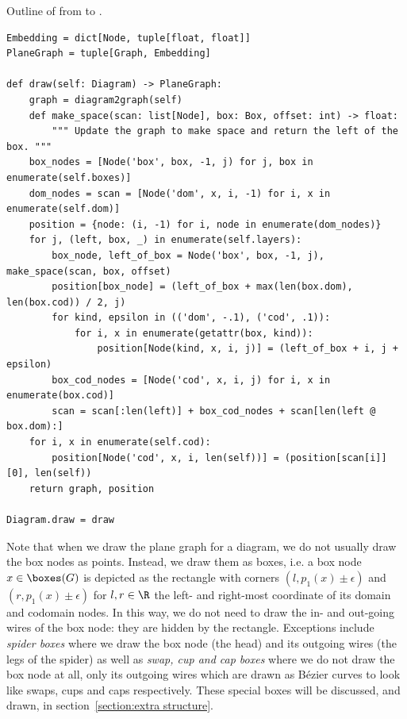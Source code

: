 \begin{python}
{\normalfont Outline of  from  to .}

\begin{verbatim}
Embedding = dict[Node, tuple[float, float]]
PlaneGraph = tuple[Graph, Embedding]

def draw(self: Diagram) -> PlaneGraph:
    graph = diagram2graph(self)
    def make_space(scan: list[Node], box: Box, offset: int) -> float:
        """ Update the graph to make space and return the left of the box. """
    box_nodes = [Node('box', box, -1, j) for j, box in enumerate(self.boxes)]
    dom_nodes = scan = [Node('dom', x, i, -1) for i, x in enumerate(self.dom)]
    position = {node: (i, -1) for i, node in enumerate(dom_nodes)}
    for j, (left, box, _) in enumerate(self.layers):
        box_node, left_of_box = Node('box', box, -1, j), make_space(scan, box, offset)
        position[box_node] = (left_of_box + max(len(box.dom), len(box.cod)) / 2, j)
        for kind, epsilon in (('dom', -.1), ('cod', .1)):
            for i, x in enumerate(getattr(box, kind)):
                position[Node(kind, x, i, j)] = (left_of_box + i, j + epsilon)
        box_cod_nodes = [Node('cod', x, i, j) for i, x in enumerate(box.cod)]
        scan = scan[:len(left)] + box_cod_nodes + scan[len(left @ box.dom):]
    for i, x in enumerate(self.cod):
        position[Node('cod', x, i, len(self))] = (position[scan[i]][0], len(self))
    return graph, position

Diagram.draw = draw
\end{verbatim}
\end{python}

Note that when we draw the plane graph for a diagram, we do not usually draw the box nodes as points.
Instead, we draw them as boxes, i.e. a box node $x \in \boxes(G)$ is depicted as the rectangle with corners $(l, p_1(x) \pm \epsilon)$ and $(r, p_1(x) \pm \epsilon)$ for $l, r \in \R$ the left- and right-most coordinate of its domain and codomain nodes.
In this way, we do not need to draw the in- and out-going wires of the box node: they are hidden by the rectangle.
Exceptions include \emph{spider boxes} where we draw the box node (the head) and its outgoing wires (the legs of the spider) as well as \emph{swap, cup and cap boxes} where we do not draw the box node at all, only its outgoing wires which are drawn as Bézier curves to look like swaps, cups and caps respectively.
These special boxes will be discussed, and drawn, in section~\ref{section:extra structure}.


